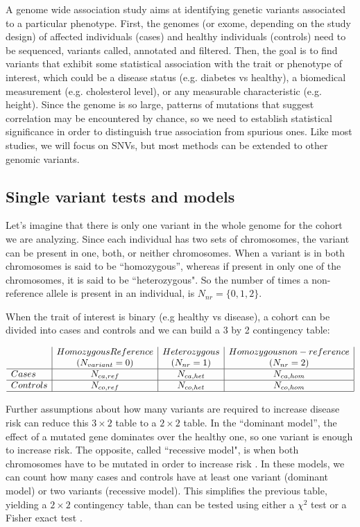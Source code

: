A genome wide association study aims at identifying genetic variants associated to a particular phenotype. First, the genomes (or exome, depending on the study design) of affected individuals (cases) and healthy individuals (controls) need to be sequenced, variants called, annotated and filtered. Then, the goal is to find variants that exhibit some statistical association with the trait or phenotype of interest, which could be a disease status (e.g. diabetes vs healthy), a biomedical measurement (e.g. cholesterol level), or any measurable characteristic (e.g. height). Since the genome is so large, patterns of mutations that suggest correlation may be encountered by chance, so we need to establish statistical significance in order to distinguish true association from spurious ones. Like most studies, we will focus on SNVs, but most methods can be extended to other genomic variants.

\subsection{Single variant tests and models \label{sec:single}}

Let's imagine that there is only one variant in the whole genome for the cohort we are analyzing. Since each individual has two sets of chromosomes, the variant can be present in one, both, or neither chromosomes. When a variant is in both chromosomes is said to be ``homozygous'', whereas if present in only one of the chromosomes, it is said to be ``heterozygous". So the number of times a non-reference allele is present in an individual, is $ N_{nr} = \{0, 1,2\}$.

When the trait of interest is binary (e.g healthy vs disease), a cohort can be divided into cases and controls and we can build a 3 by 2 contingency table:

\[
\begin{array}{l|c|c|c|}
	& Homozygous Reference & Heterozygous & Homozygous non-reference\\
	& (N_{variant} = 0) & (N_{nr} = 1) & (N_{nr} = 2) \\
    \hline 
    Cases & N_{ca,ref} & N_{ca,het} & N_{ca,hom} \\ 
    \hline 
    Controls & N_{co,ref} & N_{co,het} & N_{co,hom} \\
    \hline 
\end{array} 
\]

Further assumptions about how many variants are required to increase disease risk can reduce this $3 \times 2$ table to a $2 \times 2$ table. In the ``dominant model'', the effect of a mutated gene dominates over the healthy one, so one variant is enough to increase risk. The opposite, called ``recessive model", is when both chromosomes have to be mutated in order to increase risk \cite{balding2006tutorial, clarke2011basic}. In these models, we can count how many cases and controls have at least one variant (dominant model) or two variants (recessive model). This simplifies the previous table, yielding a $2 \times 2$ contingency table, than can be tested using either a $\chi^2$ test or a Fisher exact test \cite{balding2006tutorial}.

